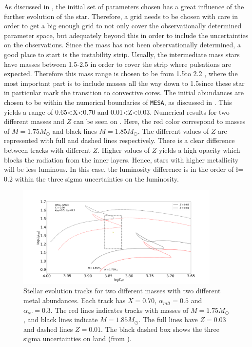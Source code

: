 As discussed in , the initial set of parameters chosen has a great influence of the further evolution of the star. Therefore, a grid needs to be chosen with care in order to get a big enough grid to not only cover the observationally determined parameter space, but adequately beyond this in order to include the uncertainties on the observations.
Since the mass has not been observationally determined, a good place to start is the instability strip. Usually, the intermediate mass stars have masses between 1.5-2.5 \msun in order to cover the strip where pulsations are expected. Therefore this mass range is chosen to be from 1.5\msun to 2.2 \msun, where the most important part is to include masses all the way down to 1.5\msun since these star in particular mark the transition to convective cores. The  initial abundances are chosen to be within the numerical boundaries of \texttt{MESA}, as discussed in . This yields a range of 0.65<X<0.70 and 0.01<Z<0.03. Numerical results for two different masses and $Z$ can be seen on . Here, the red color correspond to masses of $M=1.75M_\odot$ and black lines $M=1.85M_\odot$. The different values of $Z$ are represented with full and dashed lines respectively. There is a clear difference between tracks with different $Z$. Higher values of $Z$ yields a high opacity which blocks the radiation from the inner layers. Hence, stars with higher metallicity will be less luminous. In this case, the luminosity difference is in the order of \l = 0.2 within the three sigma uncertainties on the luminosity.  

\begin{figure}[htbp]
	\centering
	\includegraphics[width=0.9\textwidth]{test_z_2.png}
	\caption{Stellar evolution tracks for two different masses with two different metal abundances. Each track has $X=0.70$, $\alpha_{mlt}=0.5$ and $\alpha_{ov}=0.3$. The red lines indicates tracks with masses of $M=1.75M_\odot$, and black lines indicate $M=1.85M_\odot$. The full lines have $Z = 0.03$ and dashed lines $Z = 0.01$. The black dashed box shows the three sigma uncertainties on \l and \teff (from \citet{lenz2010delta}). }
	\label{diffz}
\end{figure}

